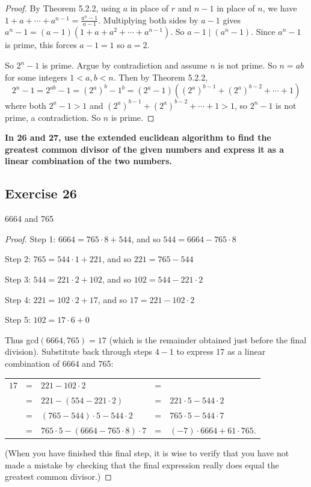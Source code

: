 \documentclass[14pt]{extarticle}
\newcommand{\cy}{\color{cyan}}
\begin{document}
\begin{proof}
By Theorem 5.2.2, using $a$ in place of $r$ and \(n - 1\)
in place of $n$, we have \(1 + a + \cdots + a^{n-1} = 
\frac{a^n-1}{a-1}\). Multiplying both sides by \(a - 1\) gives \(a^n - 1 = (a-1)(1 + a + a^2 + \cdots + a^{n-1})\).
So \(a-1 \mid (a^n - 1)\). Since \(a^n-1\) is prime, this forces \(a-1 = 1\) so \(a = 2\). 

So \(2^n-1\) is prime. Argue by contradiction and assume $n$ is not prime. So \(n = ab\) for some integers 
\(1 < a,b < n\). Then by Theorem 5.2.2,
\[
2^{n} - 1 = 2^{ab} - 1 = (2^a)^b - 1^b = (2^a - 1)((2^a)^{b-1} + (2^a)^{b-2} + \cdots + 1)
\]
where both \(2^a-1 > 1\) and \((2^a)^{b-1} + (2^a)^{b-2} + \cdots + 1 > 1\), so \(2^n - 1\) is not prime, a 
contradiction. So $n$ is prime.
\end{proof}

{\bf \cy In 26 and 27, use the extended euclidean algorithm to find the greatest common divisor of the given numbers 
and express it as a linear combination of the two numbers.}

\subsection{Exercise 26}
6664 and 765

\begin{proof}
{\cy Step 1:} \(6664 = 765 \cdot 8 + 544\), and so \(544 = 6664 - 765 \cdot 8\)

{\cy Step 2:} \(765 = 544 \cdot 1 + 221\), and so \(221 = 765 - 544\)

{\cy Step 3:} \(544 = 221 \cdot 2 + 102\), and so \(102 = 544 - 221 \cdot 2\)

{\cy Step 4:} \(221 = 102 \cdot 2 + 17\), and so \(17 = 221 - 102 \cdot 2\)

{\cy Step 5:} \(102 = 17 \cdot 6 + 0\)

Thus gcd\((6664, 765) = 17\) (which is the remainder obtained just before the final division). Substitute back 
through steps $4-1$ to express 17 as a linear combination of 6664 and 765:

\begin{tabular}{rclcl}
\(17\) & = & \(221 - 102 \cdot 2\) & = & \(\) \\
\(\) & = & \(221 - (554 - 221 \cdot 2)\) & = & \(221 \cdot 5 - 544 \cdot 2\) \\
\(\) & = & \((765 - 544) \cdot 5 - 544 \cdot 2\) & = & \(765 \cdot 5 - 544 \cdot 7\) \\
\(\) & = & \(765 \cdot 5 - (6664 - 765 \cdot 8) \cdot 7 \) & = & \((-7) \cdot 6664 + 61 \cdot 765\).
\end{tabular}

(When you have finished this final step, it is wise to verify that you have not made a mistake by checking that 
the final expression really does equal the greatest common divisor.)
\end{proof}
\end{document}
